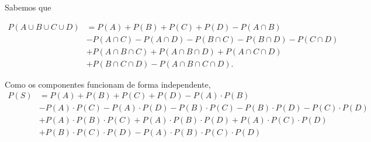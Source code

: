 \documentclass[
	12pt,				%
	openright,			%
	twoside,			%
	a4paper,			%
	english,			%
	french,				%
	spanish,			%
	brazil,				%
	]{abntex2}
\begin{document}
\vspace{0.5cm}
Sabemos que

\begin{align*}
P(A \cup B \cup C \cup D) &= P(A) + P(B) + P(C) + P(D) - P(A \cap B)\\
&- P(A \cap C) - P(A \cap D)- P(B \cap C) - P(B \cap D) - P(C \cap D)\\
&+ P(A \cap B \cap C) + P(A \cap B \cap D) + P(A \cap C \cap D)\\
&+ P(B \cap C \cap D) - P(A \cap B \cap C \cap D).
\end{align*}

Como os componentes funcionam de forma independente,
\begin{align*}
P(S) &= P(A) + P(B) + P(C) + P(D) - P(A) \cdot P(B)\\
&- P(A) \cdot P(C) - P(A) \cdot P(D) - P(B) \cdot P(C) - P(B) \cdot P(D) - P(C) \cdot P(D)\\
&+ P(A) \cdot P(B) \cdot P(C) + P(A) \cdot P(B) \cdot P(D) + P(A) \cdot P(C) \cdot P(D)\\
&+ P(B) \cdot P(C) \cdot P(D) - P(A) \cdot P(B) \cdot P(C) \cdot P(D)
\end{align*}


\end{document}
